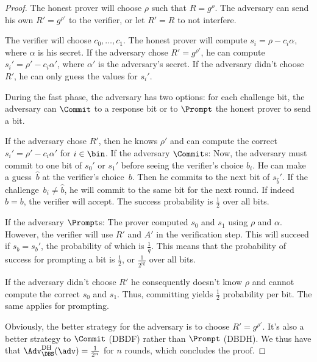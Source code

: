\begin{proof}
  The honest prover will choose \(\rho\) such that \(R = g^\rho\).
  The adversary can send his own \(R' = g^{\rho'}\) to the verifier, or let 
  \(R' = R\) to not interfere.

  The verifier will choose \(c_0, \dotsc, c_1\).
  The honest prover will compute \(s_i = \rho - c_i \alpha\), where \(\alpha\) 
  is his secret.
  If the adversary chose \(R' = g^{\rho'}\), he can compute \(s_i' = \rho' - 
  c_i \alpha'\), where \(\alpha'\) is the adversary's secret.
  If the adversary didn't choose \(R'\), he can only guess the values for 
  \(s_i'\).

  During the fast phase, the adversary has two options:
  for each challenge bit, the adversary can \(\Commit\) to a response bit or to 
  \(\Prompt\) the honest prover to send a bit.

  If the adversary chose \(R'\), then he knows \(\rho'\) and can compute the 
  correct \(s_i' = \rho' - c_i \alpha'\) for \(i\in \bin\).
  If the adversary \(\Commit\)s:
  Now, the adversary must commit to one bit of \(s_0'\) or \(s_1'\) before 
  seeing the verifier's choice \(b_i\).
  He can make a guess~\(\hat b\) at the verifier's choice~\(b\).
  Then he commits to the next bit of \(s_{\hat b}'\).
  If the challenge~\(b_i \neq \hat b\), he will commit to the same bit for the 
  next round.
  If indeed \(\hat b = b\), the verifier will accept.
  The success probability is \(\frac{1}{2}\) over all bits.

  If the adversary \(\Prompt\)s:
  The prover computed \(s_0\) and \(s_1\) using \(\rho\) and \(\alpha\).
  However, the verifier will use \(R'\) and \(A'\) in the verification step.
  This will succeed if \(s_b = s_b'\), the probability of which is 
  \(\frac{1}{q}\).
  This means that the probability of success for prompting a bit is 
  \(\frac{1}{2}\), or \(\frac{1}{2^{|q|}}\) over all bits.

  If the adversary didn't choose \(R'\) he consequently doesn't know \(\rho\) 
  and cannot compute the correct \(s_0\) and \(s_1\).
  Thus, committing yields \(\frac{1}{2}\) probability per bit.
  The same applies for prompting.

  Obviously, the better strategy for the adversary is to choose \(R' = 
  g^{\rho'}\).
  It's also a better strategy to \(\Commit\) (\ac{DBDF}) rather than 
  \(\Prompt\) (\ac{DBDH}).
  We thus have that
  \(\Adv_{\DBS}^{\text{DH}}(\adv) = \frac{1}{2^n}\) for \(n\) rounds,
  which concludes the proof.
\end{proof}

